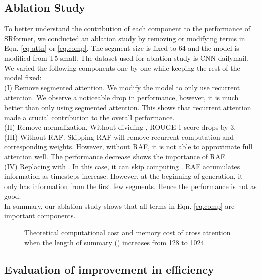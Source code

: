 \documentclass[11pt]{article}
\begin{document}
\subsection{Ablation Study}
To better understand the contribution of each component to the performance of SRformer, we conducted an ablation study by removing or modifying terms in Eqn. \ref{eq-attn} or \ref{eq.comp}.
The segment size is fixed to 64 and the model is modified from T5-small. The dataset used for ablation study is CNN-dailymail. We varied the following components one by one while keeping the rest of the model fixed:\\
(I) Remove segmented attention. 
We modify the model to only use recurrent attention. We observe a noticeable drop in performance, however, it is much better than only using segmented attention. This shows that recurrent attention made a crucial contribution to the overall performance.\\
(II) Remove normalization.
Without dividing , ROUGE 1 score drops by 3.\\
(III) Without RAF.
Skipping RAF will remove recurrent computation and corresponding weights. However, without RAF, it is not able to approximate full attention well. The performance decrease shows the importance of RAF.\\
(IV) Replacing  with . In this case, it can skip computing . RAF accumulates information as timesteps increase. However, at the beginning of generation, it only has information from the first few segments. Hence the performance is not as good.\\
In summary, our ablation study shows that all terms in Eqn. \ref{eq.comp} are important components.

\begin{figure*}[htbp]
    \centering
    \qquad
    \caption{Theoretical computational cost and memory cost of cross attention when the length of summary () increases from 128 to 1024. }\label{fig:cost}\end{figure*}
\subsection{Evaluation of improvement in efficiency}
\end{document}
